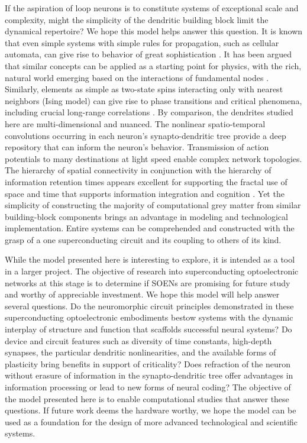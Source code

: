 \documentclass[twocolumn]{article}
\begin{document}
If the aspiration of loop neurons is to constitute systems of exceptional scale and complexity, might the simplicity of the dendritic building block limit the dynamical repertoire? We hope this model helps answer this question. It is known that even simple systems with simple rules for propagation, such as cellular automata, can give rise to behavior of great sophistication \cite{Wolfram_01}. It has been argued that similar concepts can be applied as a starting point for physics, with the rich, natural world emerging based on the interactions of fundamental nodes \cite{Wolfram_02}. Similarly, elements as simple as two-state spins interacting only with nearest neighbors (Ising model) can give rise to phase transitions and critical phenomena, including crucial long-range correlations \cite{PhaseTransitionsBooks}. By comparison, the dendrites studied here are multi-dimensional and nuanced. The nonlinear spatio-temporal convolutions occurring in each neuron's synapto-dendritic tree provide a deep repository that can inform the neuron's behavior. Transmission of action potentials to many destinations at light speed enable complex network topologies. The hierarchy of spatial connectivity in conjunction with the hierarchy of information retention times appears excellent for supporting the fractal use of space and time that supports information integration \cite{} and cognition \cite{}. Yet the simplicity of constructing the majority of computational grey matter from similar building-block components brings an advantage in modeling and technological implementation. Entire systems can be comprehended and constructed with the grasp of a one superconducting circuit and its coupling to others of its kind.

While the model presented here is interesting to explore, it is intended as a tool in a larger project. The objective of research into superconducting optoelectronic networks at this stage is to determine if SOENs are promising for future study and worthy of appreciable investment. We hope this model will help answer several questions. Do the neuromorphic circuit principles demonstrated in these superconducting optoelectronic embodiments bestow systems with the dynamic interplay of structure and function that scaffolds successful neural systems? Do device and circuit features such as diversity of time constants, high-depth synapses, the particular dendritic nonlinearities, and the available forms of plasticity bring benefits in support of criticality? Does refraction of the neuron without erasure of information in the synapto-dendritic tree offer advantages in information processing or lead to new forms of neural coding? The objective of the model presented here is to enable computational studies that answer these questions. If future work deems the hardware worthy, we hope the model can be used as a foundation for the design of more advanced technological and scientific systems.
\end{document}
